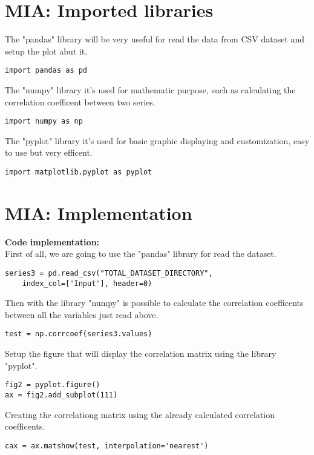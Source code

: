 
\section{MIA: Imported libraries}
The "pandas" library will be very useful for read the data from CSV dataset and setup the plot abut it.
\begin{lstlisting}
import pandas as pd
\end{lstlisting}

The "numpy" library it's used for mathematic purpose, such as calculating the correlation coefficent between two series.
\begin{lstlisting}
import numpy as np
\end{lstlisting}

 
The "pyplot" library it's used for basic graphic displaying and customization, easy to use but very efficent.
\begin{lstlisting}
import matplotlib.pyplot as pyplot
\end{lstlisting}

\section{MIA: Implementation}
\textbf{Code implementation:}\\
First of all, we are going to use the "pandas" library for read the dataset.
\begin{lstlisting}
series3 = pd.read_csv("TOTAL_DATASET_DIRECTORY", 
	index_col=['Input'], header=0)
\end{lstlisting}

Then with the library "numpy" is possible to calculate the correlation coefficents between all the variables just read above.
\begin{lstlisting}
test = np.corrcoef(series3.values)
\end{lstlisting}

Setup the figure that will display the correlation matrix using the library "pyplot".
\begin{lstlisting}
fig2 = pyplot.figure()
ax = fig2.add_subplot(111)
\end{lstlisting}

Creating the correlationg matrix using the already calculated correlation coefficents.
\begin{lstlisting}
cax = ax.matshow(test, interpolation='nearest')
\end{lstlisting}

